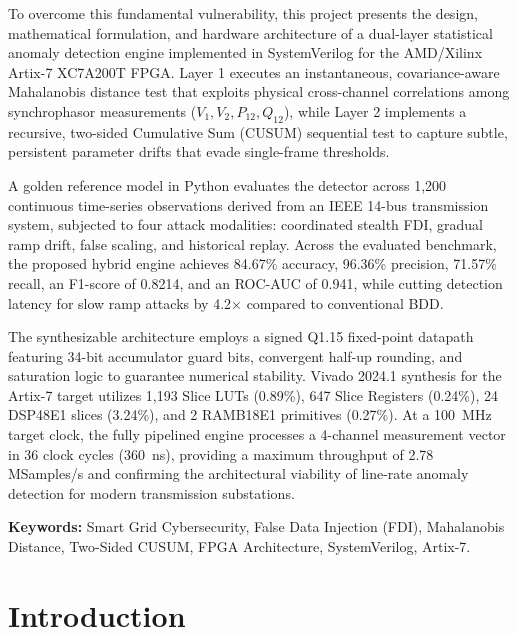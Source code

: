 \documentclass[11pt,a4paper]{report}
\begin{document}
To overcome this fundamental vulnerability, this project presents the
design, mathematical formulation, and hardware architecture of a dual-layer
statistical anomaly detection engine implemented in SystemVerilog for the
AMD/Xilinx Artix-7 XC7A200T FPGA. Layer 1 executes an instantaneous,
covariance-aware Mahalanobis distance test that exploits physical cross-channel
correlations among synchrophasor measurements ($V_1, V_2, P_{12}, Q_{12}$),
while Layer 2 implements a recursive, two-sided Cumulative Sum (CUSUM) sequential
test to capture subtle, persistent parameter drifts that evade single-frame
thresholds.

A golden reference model in Python evaluates the detector across 1,200 continuous
time-series observations derived from an IEEE 14-bus transmission system,
subjected to four attack modalities: coordinated stealth FDI, gradual ramp drift,
false scaling, and historical replay. Across the evaluated benchmark, the proposed
hybrid engine achieves 84.67\% accuracy, 96.36\% precision, 71.57\% recall, an
F1-score of 0.8214, and an ROC-AUC of 0.941, while cutting detection latency for
slow ramp attacks by 4.2$\times$ compared to conventional BDD.

The synthesizable architecture employs a signed Q1.15 fixed-point datapath
featuring 34-bit accumulator guard bits, convergent half-up rounding, and
saturation logic to guarantee numerical stability. Vivado 2024.1 synthesis for
the Artix-7 target utilizes 1,193 Slice LUTs (0.89\%), 647 Slice Registers
(0.24\%), 24 DSP48E1 slices (3.24\%), and 2 RAMB18E1 primitives (0.27\%). At a
100~MHz target clock, the fully pipelined engine processes a 4-channel measurement
vector in 36 clock cycles (360~ns), providing a maximum throughput of 2.78
MSamples/s and confirming the architectural viability of line-rate anomaly
detection for modern transmission substations.

\vspace{0.8cm}
\noindent\textbf{Keywords:} Smart Grid Cybersecurity, False Data Injection (FDI),
Mahalanobis Distance, Two-Sided CUSUM, FPGA Architecture, SystemVerilog, Artix-7.

\clearpage
\tableofcontents
\listoffigures
\listoftables
\clearpage
{}


\chapter{Introduction}
\end{document}
